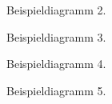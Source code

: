 \begin{figure}
\centering

  \caption{Beispieldiagramm 2.}
  \label{fig:eval:diag2}
\end{figure}

\begin{figure}
\centering

  \caption{Beispieldiagramm 3.}
  \label{fig:eval:diag3}
\end{figure}

\begin{figure}
\centering

  \caption{Beispieldiagramm 4.}
  \label{fig:eval:diag4}
\end{figure}

\begin{figure}
  \centering
  
  \caption{Beispieldiagramm 5. }
  \label{fig:eval:diag5}
\end{figure}

